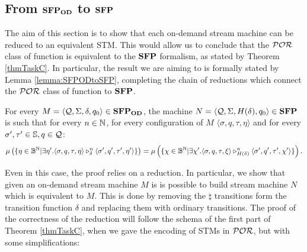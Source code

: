 \subsection{From $\mathbf{SFP_{\mathbf{OD}}}$ to $\mathbf{SFP}$}
\label{sub:sfpodtosfp}
The aim of this section is to show that each
on-demand stream machine can be reduced to an equivalent STM.
%
This would allow us to conclude that the $\mathcal{POR}$ class of function is
equivalent to the $\mathbf{SFP}$ formalism, as stated by Theorem \ref{thmTaskC}.
In particular, the result we are aiming to is formally stated by Lemma \ref{lemma:SFPODtoSFP},
completing the chain of reductions which connect the $\mathcal{POR}$ class of function to $\mathbf{SFP}$.

\begin{lemma}
  \label{lemma:SFPODtoSFP}
  For every $M = \langle \mathcal{Q}, \Sigma, \delta, q_0\rangle
  \in \mathbf{SFP_{\mathbf{OD}}}$, the machine $N = \langle \mathcal{Q}, \Sigma, H(\delta), q_0\rangle
  \in \mathbf{SFP}$ is such that for every $n \in \mathbb{N}$,
  for every configuration of $M$ $\langle \sigma, q, \tau, \eta\rangle$ and for
  every $\sigma', \tau' \in \mathbb{S}, q \in \mathcal{Q}$:
  $$
  \mu \left(\{\eta \in \mathbb{B}^{\mathbb{N}}| \exists \eta'. \langle \sigma, q, \tau, \eta\rangle\triangleright^{n}_{\delta} \langle \sigma', q', \tau', \eta'\rangle\}\right)
  =
  \mu \left(\{\chi \in \mathbb{B}^{\mathbb{N}}|  \exists \chi'. \langle \sigma, q, \tau, \xi\rangle\triangleright^{n}_{H(\delta)} \langle \sigma', q', \tau', \chi'\rangle\}\right).
  $$
\end{lemma}

\noindent
Even in this case, the proof relies on a reduction. In particular,
we show that
given an on-demand stream machine $M$ is is possible to build
stream machine $N$ which is equivalent to $M$.
This is done by removing the $\natural$ transitions
form the transition function $\delta$ and replacing them with ordinary transitions.
%
The proof of the correctness of the reduction will follow the schema of
the first part of Theorem \ref{thmTaskC}, when we gave the encoding of
STMs in $\mathcal{POR}$, but with some simplifications:

